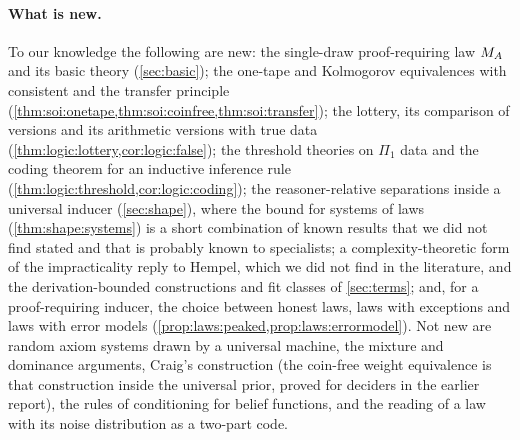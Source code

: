 \paragraph{What is new.}
To our knowledge the following are new: the single-draw proof-requiring law $M_{A}$ and its basic theory (\cref{sec:basic}); the one-tape and Kolmogorov equivalences with consistent \SOIabbr and the transfer principle (\cref{thm:soi:onetape,thm:soi:coinfree,thm:soi:transfer}); the lottery, its comparison of versions and its arithmetic versions with true data (\cref{thm:logic:lottery,cor:logic:false}); the threshold theories on $\Pi_1$ data and the coding theorem for an inductive inference rule (\cref{thm:logic:threshold,cor:logic:coding}); the reasoner-relative separations inside a universal inducer (\cref{sec:shape}), where the bound for systems of laws (\cref{thm:shape:systems}) is a short combination of known results that we did not find stated and that is probably known to specialists; a complexity-theoretic form of the impracticality reply to Hempel, which we did not find in the literature, and the derivation-bounded constructions and fit classes of \cref{sec:terms}; and, for a proof-requiring inducer, the choice between honest laws, laws with exceptions and laws with error models (\cref{prop:laws:peaked,prop:laws:errormodel}). Not new are random axiom systems drawn by a universal machine, the mixture and dominance arguments, Craig's construction (the coin-free weight equivalence is that construction inside the universal prior, proved for deciders in the earlier report), the rules of conditioning for belief functions, and the reading of a law with its noise distribution as a two-part code.
